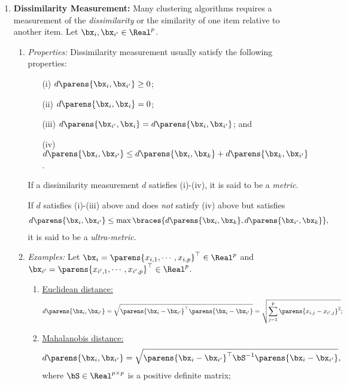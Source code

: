 \documentclass[12pt]{article}
\begin{document}
\begin{enumerate}[label=\textbf{\arabic*.}]

	\item \textbf{Dissimilarity Measurement:} Many clustering algorithms requires a measurement of the \emph{dissimilarity} or the similarity of one item relative to another item. Let $\bx_i, \bx_{i'} \in \Real^p$. 
	\begin{enumerate}
		\item \textit{Properties:} Dissimilarity measurement usually satisfy the following properties: 
		\begin{enumerate}
			\item[(i)] $d \parens{\bx_i, \bx_{i'}} \ge 0$; 
			\item[(ii)] $d \parens{\bx_i, \bx_i} = 0$; 
			\item[(iii)] $d \parens{\bx_{i'}, \bx_i} = d \parens{\bx_i, \bx_{i'}}$; and 
			\item[(iv)] $d \parens{\bx_i, \bx_{i'}} \le d \parens{\bx_i, \bx_k} + d \parens{\bx_k, \bx_{i'}}$. 
		\end{enumerate}
		If a dissimilarity measurement $d$ satisfies (i)-(iv), it is said to be a \textit{metric}. 
		
		If $d$ satisfies (i)-(iii) above and does \emph{not} satisfy (iv) above but satisfies 
		\begin{align*}
			d \parens{\bx_i, \bx_{i'}} \le \max \braces{d \parens{\bx_i, \bx_k}, d \parens{\bx_{i'}, \bx_k}}, 
		\end{align*}
		it is said to be a \textit{ultra-metric}. 
		
		\item \textit{Examples:} Let $\bx_i = \parens{x_{i,1}, \cdots, x_{i,p}}^\top \in \Real^p$ and $\bx_{i'} = \parens{x_{i',1}, \cdots, x_{i',p}}^\top \in \Real^p$. 
		\begin{enumerate}
			\item \underline{Euclidean distance:} 
			\begin{align*}
				d \parens{\bx_i, \bx_{i'}} = \sqrt{\parens{\bx_i - \bx_{i'}}^\top \parens{\bx_i - \bx_{i'}}} = \sqrt{\sum_{j=1}^p \parens{x_{i,j} - x_{i',j}}^2}; 
			\end{align*}
			
			\item \underline{Mahalanobis distance:} 
			\begin{align*}
				d \parens{\bx_i, \bx_{i'}} = \sqrt{\parens{\bx_i - \bx_{i'}}^\top \bS^{-1} \parens{\bx_i - \bx_{i'}}}, 
			\end{align*}
			where $\bS \in \Real^{p \times p}$ is a positive definite matrix; 
			

\end{enumerate}
\end{enumerate}
\end{enumerate}
\end{document}
